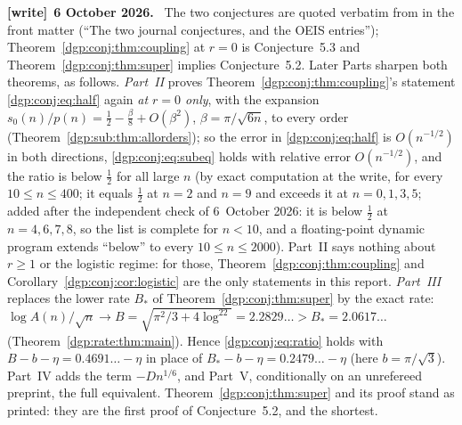 \documentclass[11pt,letterpaper]{article}
\numberwithin{equation}{section}
\theoremstyle{remark}\newtheorem{remark}[theorem]{Remark}
\newenvironment{writenote}[1][]{\par\smallskip\begingroup\small
 \noindent\textbf{[write]}\if\relax\detokenize{#1}\relax\else~\textbf{#1.}\fi\ }%
 {\par\endgroup\smallskip}
\begin{document}
\begin{writenote}[6 October 2026]
The two conjectures are quoted verbatim from \cite{abek} in the front matter (``The two journal conjectures, and the OEIS entries''); Theorem~\ref{dgp:conj:thm:coupling} at $r=0$ is Conjecture~5.3 and Theorem~\ref{dgp:conj:thm:super} implies Conjecture~5.2. Later Parts sharpen both theorems, as follows. \emph{Part~II} proves Theorem~\ref{dgp:conj:thm:coupling}'s statement \eqref{dgp:conj:eq:half} again \emph{at $r=0$ only}, with the expansion $s_0(n)/p(n)=\frac12-\frac\beta8+O(\beta^2)$, $\beta=\pi/\sqrt{6n}$, to every order (Theorem~\ref{dgp:sub:thm:allorders}); so the error in \eqref{dgp:conj:eq:half} is $O(n^{-1/2})$ in both directions, \eqref{dgp:conj:eq:subeq} holds with relative error $O(n^{-1/2})$, and the ratio is below $\frac12$ for all large $n$ (by exact computation at the write, for every $10\le n\le400$; it equals $\frac12$ at $n=2$ and $n=9$ and exceeds it at $n=0,1,3,5$\textup{; added after the independent check of 6~October 2026: it is below $\frac12$ at $n=4,6,7,8$, so the list is complete for $n<10$, and a floating-point dynamic program extends ``below'' to every $10\le n\le2000$}). Part~II says nothing about $r\ge1$ or the logistic regime: for those, Theorem~\ref{dgp:conj:thm:coupling} and Corollary~\ref{dgp:conj:cor:logistic} are the only statements in this report. \emph{Part~III} replaces the lower rate $B_*$ of Theorem~\ref{dgp:conj:thm:super} by the exact rate: $\log A(n)/\sqrt n\to B=\sqrt{\pi^2/3+4\log^22}=2.2829\ldots>B_*=2.0617\ldots$ (Theorem~\ref{dgp:rate:thm:main}). Hence \eqref{dgp:conj:eq:ratio} holds with $B-b-\eta=0.4691\ldots-\eta$ in place of $B_*-b-\eta=0.2479\ldots-\eta$ (here $b=\pi/\sqrt3$). Part~IV adds the term $-Dn^{1/6}$, and Part~V, conditionally on an unrefereed preprint, the full equivalent. Theorem~\ref{dgp:conj:thm:super} and its proof stand as printed: they are the first proof of Conjecture~5.2, and the shortest.
\end{writenote}
\end{document}
